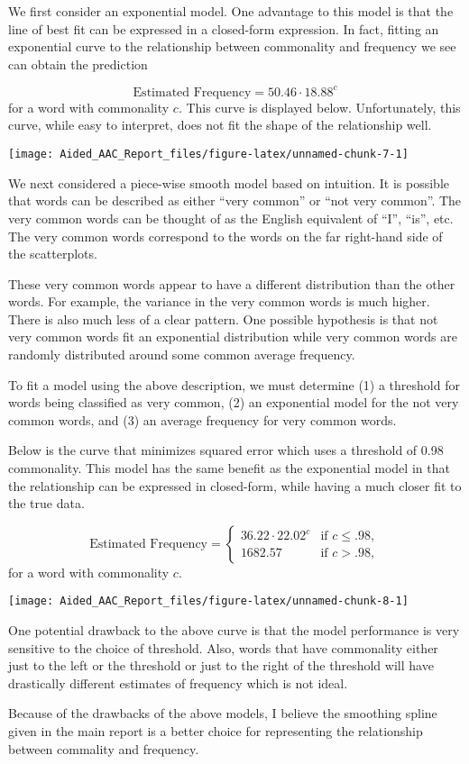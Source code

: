 \documentclass[
]{article}
\begin{document}
We first consider an exponential model. One advantage to this model is
that the line of best fit can be expressed in a closed-form expression.
In fact, fitting an exponential curve to the relationship between
commonality and frequency we see can obtain the prediction

\[\text{Estimated Frequency} = 50.46\cdot 18.88^{c}\] for a word with
commonality \(c\). This curve is displayed below. Unfortunately, this
curve, while easy to interpret, does not fit the shape of the
relationship well.

\begin{center}\texttt{[image: Aided\_AAC\_Report\_files/figure-latex/unnamed-chunk-7-1]} \end{center}

We next considered a piece-wise smooth model based on intuition. It is
possible that words can be described as either ``very common'' or ``not
very common''. The very common words can be thought of as the English
equivalent of ``I'', ``is'', etc. The very common words correspond to
the words on the far right-hand side of the scatterplots.

These very common words appear to have a different distribution than the
other words. For example, the variance in the very common words is much
higher. There is also much less of a clear pattern. One possible
hypothesis is that not very common words fit an exponential distribution
while very common words are randomly distributed around some common
average frequency.

To fit a model using the above description, we must determine (1) a
threshold for words being classified as very common, (2) an exponential
model for the not very common words, and (3) an average frequency for
very common words.

Below is the curve that minimizes squared error which uses a threshold
of 0.98 commonality. This model has the same benefit as the exponential
model in that the relationship can be expressed in closed-form, while
having a much closer fit to the true data.

\[\text{Estimated Frequency} = \begin{cases} 36.22\cdot 22.02^{c} & \text{if } c\leq .98,\\  1682.57 & \text{if } c> .98, \end{cases}\]
for a word with commonality \(c\).

\begin{center}\texttt{[image: Aided\_AAC\_Report\_files/figure-latex/unnamed-chunk-8-1]} \end{center}

One potential drawback to the above curve is that the model performance
is very sensitive to the choice of threshold. Also, words that have
commonality either just to the left or the threshold or just to the
right of the threshold will have drastically different estimates of
frequency which is not ideal.

Because of the drawbacks of the above models, I believe the smoothing
spline given in the main report is a better choice for representing the
relationship between commality and frequency.
\end{document}
